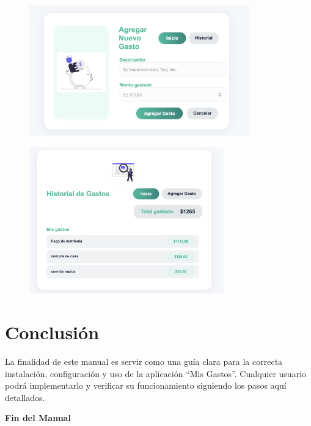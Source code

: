 \documentclass[12pt,a4paper]{article}
\begin{document}
\caption{Formulario para agregar gastos}
\begin{figure}[H]
    \centering
    \includegraphics[width=0.85\textwidth]{Formulario.png}
    \end{figure}    

\caption{Historial de gastos}
\begin{figure}[H]
    \centering
    \includegraphics[width=0.75\textwidth]{Historial de gastos.png}
    \end{figure}
    
\section{Conclusión}

La finalidad de este manual es servir como una guía clara para la correcta instalación, configuración y uso de la aplicación “Mis Gastos”. Cualquier usuario podrá implementarlo y verificar su funcionamiento siguiendo los pasos aquí detallados.

\vfill
\begin{center}
    \textbf{ Fin del Manual }
\end{center}
\end{document}
